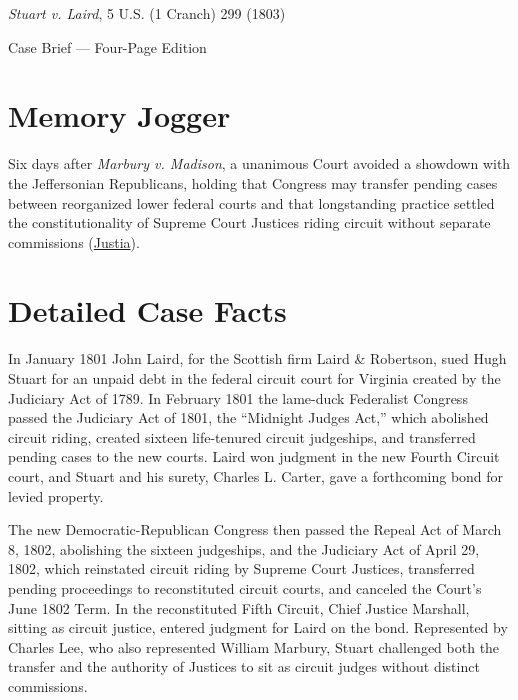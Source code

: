 \documentclass[12pt]{article}
\begin{document}
\begin{center}
{\LARGE \textit{Stuart v. Laird}, 5 U.S. (1 Cranch) 299 (1803)\par}
\vspace{0.8em}
{\large Case Brief --- Four-Page Edition\par}
\end{center}
\vspace{1em}

\section{Memory Jogger}

Six days after \textit{Marbury v. Madison}, a unanimous Court avoided a showdown with the Jeffersonian Republicans, holding that Congress may transfer pending cases between reorganized lower federal courts and that longstanding practice settled the constitutionality of Supreme Court Justices riding circuit without separate commissions (\href{https://supreme.justia.com/cases/federal/us/5/299/}{Justia}).

\section{Detailed Case Facts}

In January 1801 John Laird, for the Scottish firm Laird \& Robertson, sued Hugh Stuart for an unpaid debt in the federal circuit court for Virginia created by the Judiciary Act of 1789. In February 1801 the lame-duck Federalist Congress passed the Judiciary Act of 1801, the ``Midnight Judges Act,'' which abolished circuit riding, created sixteen life-tenured circuit judgeships, and transferred pending cases to the new courts. Laird won judgment in the new Fourth Circuit court, and Stuart and his surety, Charles L. Carter, gave a forthcoming bond for levied property.

The new Democratic-Republican Congress then passed the Repeal Act of March 8, 1802, abolishing the sixteen judgeships, and the Judiciary Act of April 29, 1802, which reinstated circuit riding by Supreme Court Justices, transferred pending proceedings to reconstituted circuit courts, and canceled the Court's June 1802 Term. In the reconstituted Fifth Circuit, Chief Justice Marshall, sitting as circuit justice, entered judgment for Laird on the bond. Represented by Charles Lee, who also represented William Marbury, Stuart challenged both the transfer and the authority of Justices to sit as circuit judges without distinct commissions.
\end{document}
